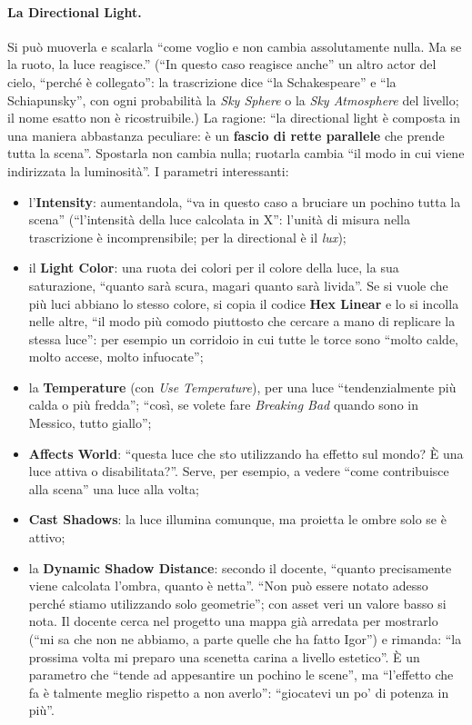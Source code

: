 \paragraph{La Directional Light.} Si può muoverla e scalarla ``come voglio e non cambia
assolutamente nulla. Ma se la ruoto, la luce reagisce.'' (``In questo caso reagisce anche''
un altro actor del cielo, ``perché è collegato'': la trascrizione dice ``la Schakespeare'' e
``la Schiapunsky'', con ogni probabilità la \emph{Sky Sphere} o la \emph{Sky Atmosphere}
del livello; il nome esatto non è ricostruibile.) La ragione: ``la directional light è
composta in una maniera abbastanza peculiare: è un \textbf{fascio di rette parallele} che
prende tutta la scena''. Spostarla non cambia nulla; ruotarla cambia ``il modo in cui viene
indirizzata la luminosità''. I parametri interessanti:
\begin{itemize}
  \item l'\textbf{Intensity}: aumentandola, ``va in questo caso a bruciare un pochino tutta la
        scena'' (``l'intensità della luce calcolata in X'': l'unità di misura nella
        trascrizione è incomprensibile; per la directional è il \emph{lux});
  \item il \textbf{Light Color}: una ruota dei colori per il colore della luce, la sua
        saturazione, ``quanto sarà scura, magari quanto sarà livida''. Se si vuole che più
        luci abbiano lo stesso colore, si copia il codice \textbf{Hex Linear} e lo si incolla
        nelle altre, ``il modo più comodo piuttosto che cercare a mano di replicare la stessa
        luce'': per esempio un corridoio in cui tutte le torce sono ``molto calde, molto
        accese, molto infuocate'';
  \item la \textbf{Temperature} (con \emph{Use Temperature}), per una luce ``tendenzialmente
        più calda o più fredda''; ``così, se volete fare \emph{Breaking Bad} quando sono in
        Messico, tutto giallo'';
  \item \textbf{Affects World}: ``questa luce che sto utilizzando ha effetto sul mondo? È una
        luce attiva o disabilitata?''. Serve, per esempio, a vedere ``come contribuisce alla
        scena'' una luce alla volta;
  \item \textbf{Cast Shadows}: la luce illumina comunque, ma proietta le ombre solo se è
        attivo;
  \item la \textbf{Dynamic Shadow Distance}: secondo il docente, ``quanto precisamente
        viene calcolata l'ombra, quanto è netta''. ``Non può essere notato adesso perché
        stiamo utilizzando solo geometrie''; con asset veri un valore basso si nota. Il
        docente cerca nel progetto una mappa già arredata per mostrarlo (``mi sa che non ne
        abbiamo, a parte quelle che ha fatto Igor'') e rimanda: ``la prossima volta mi
        preparo una scenetta carina a livello estetico''. È un parametro che ``tende ad
        appesantire un pochino le scene'', ma ``l'effetto che fa è talmente meglio rispetto a
        non averlo'': ``giocatevi un po' di potenza in più''.
\end{itemize}

